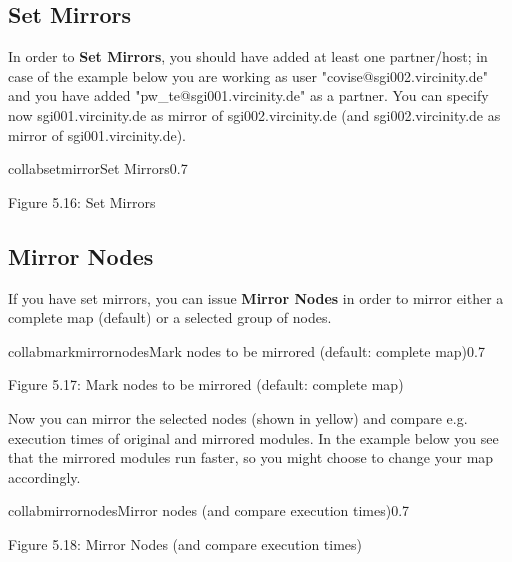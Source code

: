 \subsection{Set Mirrors}

In order to {\bf Set Mirrors}, you should have added at least one partner/host; in case of the example below
you are working as user "covise@sgi002.vircinity.de" and you have added "pw\_te@sgi001.vircinity.de" as a partner. You can
specify now sgi001.vircinity.de as mirror of sgi002.vircinity.de (and sgi002.vircinity.de as mirror of
sgi001.vircinity.de).
 
\begin{covimg}{collab}{setmirror}{Set Mirrors}{0.7}\end{covimg}
\begin{htmlonly}
Figure 5.16: Set Mirrors
\vspace{0.5cm}
\end{htmlonly}

\clearpage

\subsection{Mirror Nodes}

If you have set mirrors, you can issue {\bf Mirror Nodes} in order to mirror either a complete map (default) or a selected group of
nodes.


\begin{covimg}{collab}{markmirrornodes}{Mark nodes to be mirrored (default: complete map)}{0.7}\end{covimg}
\begin{htmlonly}
Figure 5.17: Mark nodes to be mirrored (default: complete map)
\vspace{0.5cm}
\end{htmlonly}

\clearpage

Now you can mirror the selected nodes (shown in yellow) and compare e.g. execution times of original and mirrored
modules. In the example below you see that the mirrored modules run faster, so you might choose to change
your map accordingly.

\begin{covimg}{collab}{mirrornodes}{Mirror nodes (and compare execution times)}{0.7}\end{covimg}
\begin{htmlonly}
Figure 5.18: Mirror Nodes (and compare execution times)
\vspace{0.5cm}
\end{htmlonly}
\clearpage

